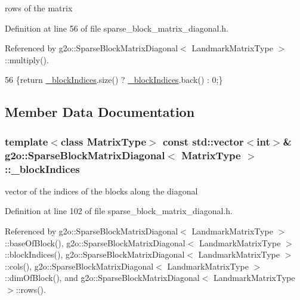 rows of the matrix 



Definition at line 56 of file sparse\+\_\+block\+\_\+matrix\+\_\+diagonal.\+h.



Referenced by g2o\+::\+Sparse\+Block\+Matrix\+Diagonal$<$ Landmark\+Matrix\+Type $>$\+::multiply().


\begin{DoxyCode}
56 \{\textcolor{keywordflow}{return} \hyperlink{classg2o_1_1SparseBlockMatrixDiagonal_a12ca3362997c3ca21c8b2a203177485e}{\_blockIndices}.size() ? \hyperlink{classg2o_1_1SparseBlockMatrixDiagonal_a12ca3362997c3ca21c8b2a203177485e}{\_blockIndices}.back() : 0;\}
\end{DoxyCode}


\subsection{Member Data Documentation}
\subsubsection[{\texorpdfstring{\+\_\+block\+Indices}{_blockIndices}}]{\setlength{\rightskip}{0pt plus 5cm}template$<$class Matrix\+Type$>$ const std\+::vector$<$int$>$\& {\bf g2o\+::\+Sparse\+Block\+Matrix\+Diagonal}$<$ Matrix\+Type $>$\+::\+\_\+block\+Indices\hspace{0.3cm}{\ttfamily [protected]}}\hypertarget{classg2o_1_1SparseBlockMatrixDiagonal_a12ca3362997c3ca21c8b2a203177485e}{}\label{classg2o_1_1SparseBlockMatrixDiagonal_a12ca3362997c3ca21c8b2a203177485e}


vector of the indices of the blocks along the diagonal 



Definition at line 102 of file sparse\+\_\+block\+\_\+matrix\+\_\+diagonal.\+h.



Referenced by g2o\+::\+Sparse\+Block\+Matrix\+Diagonal$<$ Landmark\+Matrix\+Type $>$\+::base\+Of\+Block(), g2o\+::\+Sparse\+Block\+Matrix\+Diagonal$<$ Landmark\+Matrix\+Type $>$\+::block\+Indices(), g2o\+::\+Sparse\+Block\+Matrix\+Diagonal$<$ Landmark\+Matrix\+Type $>$\+::cols(), g2o\+::\+Sparse\+Block\+Matrix\+Diagonal$<$ Landmark\+Matrix\+Type $>$\+::dim\+Of\+Block(), and g2o\+::\+Sparse\+Block\+Matrix\+Diagonal$<$ Landmark\+Matrix\+Type $>$\+::rows().

